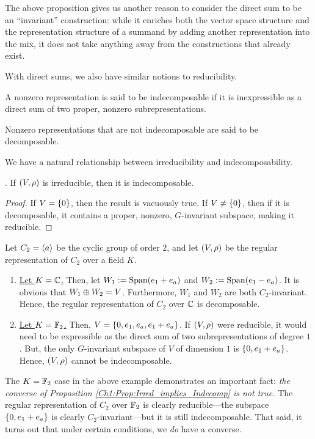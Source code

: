 The above proposition gives us another reason to consider the direct sum to be an ``invariant'' construction: while it enriches both the vector space structure and the representation structure of a summand by adding another representation into the mix, it does not take anything away from the constructions that already exist.

With direct sums, we also have similar notions to reducibility.

\begin{boxdefinition}[Indecomposability]
    A nonzero representation is said to be indecomposable if it is inexpressible as a direct sum of two proper, nonzero subrepresentations.
\end{boxdefinition}
Nonzero representations that are not indecomposable are said to be decomposable.

We have a natural relationship between irreducibility and indecomposability.

\begin{proposition} \label{Ch1:Prop:Irred_implies_Indecomp}
    . If $\left( V, \rho \right)$ is irreducible, then it is indecomposable.
\end{proposition}
\begin{proof}
    If $V = \left\{ 0 \right\}$, then the result is vacuously true. If $V \neq \left\{ 0 \right\}$, then if it is decomposable, it contains a proper, nonzero, $G$-invariant subspace, making it reducible.
\end{proof}

\begin{boxexample}
    Let $C_2 = \left\langle a \right\rangle$ be the cyclic group of order $2$, and let $\left( V, \rho \right)$ be the regular representation of $C_2$ over a field $K$.
    \begin{enumerate}
        \item \underline{Let $K = \mathbb{C}$.} Then, let $W_1 := \operatorname{Span}\!\left( e_1 + e_a \right)$ and $W_2 := \operatorname{Span}\!\left( e_1 - e_a \right)$. It is obvious that $W_1 \oplus W_2 = V$. Furthermore, $W_1$ and $W_2$ are both $C_2$-invariant. Hence, the regular representation of $C_2$ over $\mathbb{C}$ is decomposable.
        \item \underline{Let $K = \mathbb{F}_2$.} Then, $V = \left\{ 0, e_1, e_a, e_1 + e_a \right\}$. If $\left( V, \rho \right)$ were reducible, it would need to be expressible as the direct sum of two subrepresentations of degree $1$. But, the only $G$-invariant subspace of $V$ of dimension $1$ is $\left\{ 0, e_1 + e_a \right\}$. Hence, $\left( V, \rho \right)$ cannot be indecomposable.
    \end{enumerate}
\end{boxexample}
The $K = \mathbb{F}_2$ case in the above example demonstrates an important fact: \textit{the converse of Proposition \ref{Ch1:Prop:Irred_implies_Indecomp} is not true.} The regular representation of $C_2$ over $\mathbb{F}_2$ is clearly reducible---the subspace $\left\{ 0, e_1 + e_a \right\}$ is clearly $C_2$-invariant---but it is still indecomposable. That said, it turns out that under certain conditions, we \textit{do} have a converse.

